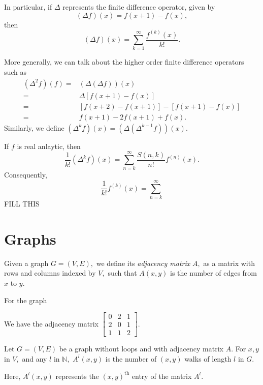 In particular, if $\Delta$ represents the finite difference operator,
given by
$$(\Delta f)(x) = f(x+1) - f(x),$$
then
$$ (\Delta f)(x) = \sum_{k=1}^{\infty} \frac{f^(k)(x)}{k!} .$$


More generally, we can talk about the higher order finite difference operators such as
\begin{align*}
	( \Delta^2 f)(f) ={}& (\Delta(\Delta f))(x) \\
	={}& \Delta \left[ f(x+1) - f(x) \right] \\
	={}& \left[ f(x+2) - f(x+1) \right] - \left[ f(x+1) - f(x) \right] \\
	={}& f(x+1) - 2 f(x+1) + f(x).
\end{align*}
Similarly, we define $(\Delta^k f)(x) = (\Delta (\Delta^{k-1} f)) (x).$
\begin{theorem}
	If $f$ is real anlaytic, then
	$$ \frac{1}{k!} (\Delta ^k f)(x) = \sum_{n=k}^{\infty} 
	\frac{S(n,k)}{n!} f^{(n)} (x) .$$
	Consequently,
	$$ \frac{1}{k!} f^{(k)} (x) = \sum_{n=k}^{\infty} $$
	FILL THIS
\end{theorem}


\section{Graphs}
\begin{definition}
	Given a graph $G = (V,E),$ we define its \emph{adjacency matrix} $A,$ as a matrix with rows and columns indexed by $V,$ such that
	$A(x,y)$ is the number of edges from $x$ to $y.$
\end{definition}

\begin{example}
	For the graph
	\begin{figure}[h]
	\centering
	\end{figure}
	We have the adjacency matrix
	$\begin{bmatrix}
		0&2&1\\
		2&0&1\\
		1&1&2
	\end{bmatrix} .$
\end{example}

\begin{theorem}
	Let $G = (V,E)$ be a graph without loops and with adjacency matrix $A.$ For $x,y$ in $V,$ and any $l$ in $\mathbb{N},$ 
	$A^l(x,y)$ is the number of $(x,y)$ walks of length $l$ in $G.$
\end{theorem}

Here, $A^l(x,y)$ represents the $(x,y)^{\text{th}}$ entry of the matrix $A^l.$

